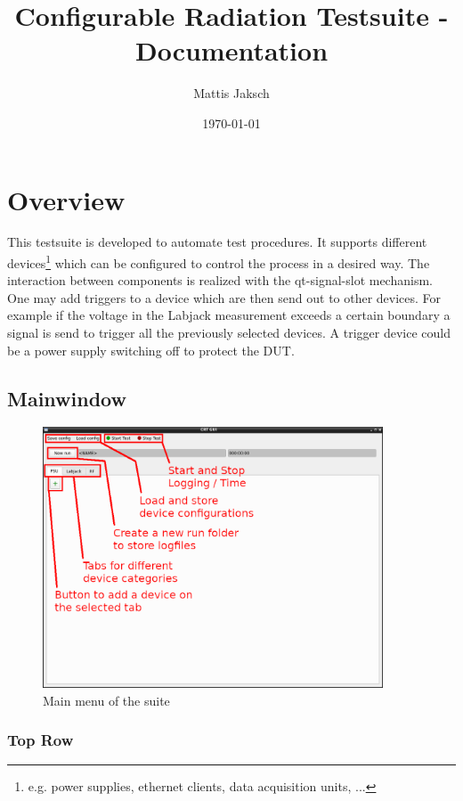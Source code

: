 \documentclass[10pt,a4paper]{article}
\title{Configurable Radiation Testsuite - Documentation}
\author{Mattis Jaksch}
\date{\today}
\begin{document}
\maketitle

\tableofcontents

\flushleft

\newpage

\section{Overview}
This testsuite is developed to automate test procedures. It supports different devices\footnote{e.g. power supplies, ethernet clients, data acquisition units, ...} which can be configured to control the process in a desired way. The interaction between components is realized with the qt-signal-slot mechanism. One may add triggers to a device which are then send out to other devices. For example if the voltage in the Labjack measurement exceeds a certain boundary a signal is send to trigger all the previously selected devices. A trigger device could be a power supply switching off to protect the DUT.

	\subsection{Mainwindow}
	
	\begin{figure}[H]
	\centering
	\includegraphics[width=0.9\textwidth]{./1_Plain_Expl.png}
	\caption{Main menu of the suite}
	\end{figure}
	
	\subsubsection{Top Row}	
	
\end{document}
